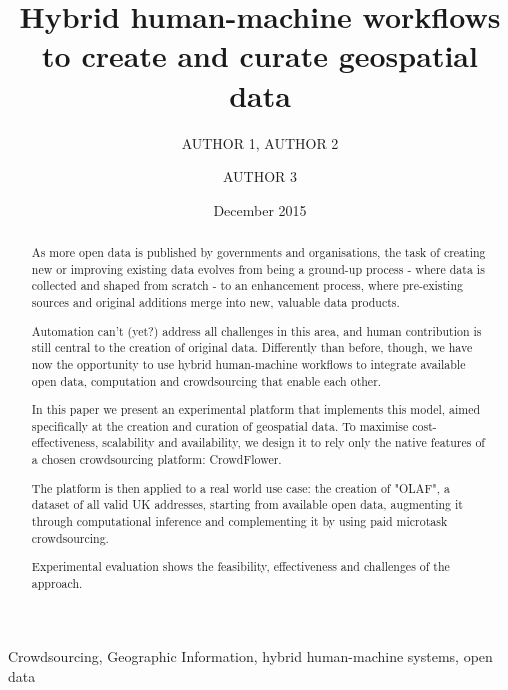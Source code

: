 \documentclass{llncs}
\title{Hybrid human-machine workflows to create and curate geospatial data}
\author{AUTHOR 1\inst{1}, AUTHOR 2\inst{1} \and AUTHOR 3\inst{2}}
\institute{INSTITUTE 1 \email{EMAIL FOR AUTHOR 1} \and INSTITUTE 2}
\date{December 2015}
\begin{document}
\maketitle

\begin{abstract}
As more open data is published by governments and organisations, the task of creating new or improving existing data evolves from being a ground-up process - where data is collected and shaped from scratch - to an enhancement process, where pre-existing sources and original additions merge into new, valuable data products. 

Automation can't (yet?) address all challenges in this area, and human contribution is still central to the creation of original data. Differently than before, though, we have now the opportunity to use hybrid human-machine workflows to integrate available open data, computation and crowdsourcing that enable each other. 

In this paper we present an experimental platform that implements this model, aimed specifically at the creation and curation of geospatial data. To maximise cost-effectiveness, scalability and availability, we design it to rely only the native features of a chosen crowdsourcing platform: CrowdFlower. 

The platform is then applied to a real world use case: the creation of "OLAF", a dataset of all valid UK addresses, starting from available open data, augmenting it through computational inference and complementing it by using paid microtask crowdsourcing. 

Experimental evaluation shows the feasibility, effectiveness and challenges of the approach.
\end{abstract}

\begin{keywords}
Crowdsourcing, Geographic Information, hybrid human-machine systems, open data 
\end{keywords}
\end{document}
